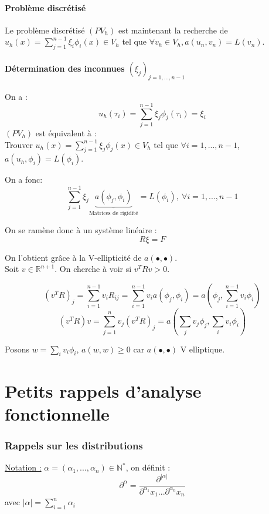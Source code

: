 \subsection{Problème discrétisé}
Le problème discrétisé $(PV_h)$ est maintenant la recherche de $u_h(x)=\sum_{j=1}^{n-1} \xi_i \phi_i(x)\in V_h$ tel que $\forall v_h\in V_h, a(u_n,v_n)=L(v_n)$.

\subsection{Détermination des inconnues $(\xi_j)_{j=1,...,n-1}$}
On a :
\[u_h(\tau_i)=\sum_{j=1}^{n-1} \xi_j \phi_j(\tau_i)=\xi_i\]
$(PV_h)$ est équivalent à : \\
Trouver $u_h(x)=\sum_{j=1}^{n-1}\xi_j \phi_j(x)\in V_h$ tel que $\forall i=1,...,n-1$, $a(u_h,\phi_i)=L(\phi_i)$. 

On a fonc:
\[\sum_{j=1}^{n-1} \xi_j \underbrace{a(\phi_j,\phi_i)}_{\text{Matrices de rigidité}}=L(\phi_i),\ \forall i=1,...,n-1\]

On se ramène donc à un système linéaire :
\[R\xi=F\]


\begin{dem}
On l'obtient grâce à la V-ellipticité de $a(\bullet,\bullet)$. \\
Soit $v\in\mathbb{R}^{n+1}$. On cherche à voir si $v^TRv>0$.

\[(v^TR)_j=\sum_{i=1}^{n-1} v_iR_{ij}=\sum_{i=1}^{n-1} v_ia(\phi_j,\phi_i)=a(\phi_j,\sum_{i=1}^{n-1} v_i\phi_i)\]
\[(v^TR)v=\sum_{j=1}^n v_j(v^TR)_j = a\left( \sum_j v_j\phi_j, \sum_i v_i\phi_i\right)\]

Posons $w=\sum_i v_i\phi_i$, $a(w,w)\geq 0$ car $a(\bullet,\bullet)$ V elliptique. 
\end{dem}

\part{Petits rappels d'analyse fonctionnelle}
\section{Rappels sur les distributions}
\underline{Notation :} $\alpha=(\alpha_1,...,\alpha_n)\in\mathbb{N}^*$, on définit :
\[\partial^\alpha=\frac{\partial^{|\alpha|}}{\partial^{\alpha_1}x_1...\partial^{\alpha_n}x_n}\]
avec $|\alpha|=\sum_{i=1}^n \alpha_i$


